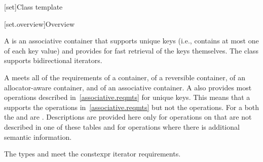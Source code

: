 [set]{Class template }

[set.overview]{Overview}

\pnum
{}%
A
is an associative container that supports unique keys (i.e., contains at most one of each key value) and
provides for fast retrieval of the keys themselves.
The
 class
supports bidirectional iterators.

\pnum
A  meets all of the requirements
of a container,
of a reversible container,
of an allocator-aware container, and
of an associative container.
A
also provides most operations described in~\ref{associative.reqmts}
for unique keys.
This means that a
supports the
operations in~\ref{associative.reqmts}
but not the
operations.
For a
both the
and
are
.
Descriptions are provided here only for operations on
that are not described in one of these tables
and for operations where there is additional semantic information.

\pnum
The types  and  meet
the constexpr iterator requirements.


